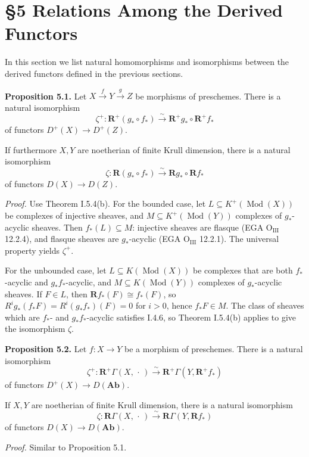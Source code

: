 \setcounter{page}{100}
\section{\S5 Relations Among the Derived Functors}

In this section we list natural homomorphisms and isomorphisms between the derived functors defined in the previous sections.

\textbf{Proposition 5.1.}
Let $X\xrightarrow{f} Y\xrightarrow{g} Z$ be morphisms of preschemes.
There is a natural isomorphism
\[
\zeta^+\colon \mathbf{R}^+(g_*\circ f_*) \xrightarrow{\sim} \mathbf{R}^+g_*\circ\mathbf{R}^+f_*
\]
of functors $D^+(X)\to D^+(Z)$.

If furthermore $X,Y$ are noetherian of finite Krull dimension, there is a natural isomorphism
\[
\zeta\colon \mathbf{R}(g_*\circ f_*) \xrightarrow{\sim} \mathbf{R}g_*\circ\mathbf{R}f_*
\]
of functors $D(X)\to D(Z)$.

\textit{Proof.}
Use Theorem I.5.4(b).
For the bounded case, let $L\subseteq K^+(\operatorname{Mod}(X))$ be complexes of injective sheaves,
and $M\subseteq K^+(\operatorname{Mod}(Y))$ complexes of $g_*$-acyclic sheaves.
Then $f_*(L)\subseteq M$: injective sheaves are flasque (EGA $\mathrm{O_{III}}$ 12.2.4),
and flasque sheaves are $g_*$-acyclic (EGA $\mathrm{O_{III}}$ 12.2.1).
The universal property yields $\zeta^+$.

\setcounter{page}{101}
For the unbounded case, let $L\subseteq K(\operatorname{Mod}(X))$ be complexes that are both $f_*$-acyclic and $g_*f_*$-acyclic,
and $M\subseteq K(\operatorname{Mod}(Y))$ complexes of $g_*$-acyclic sheaves.
If $F\in L$, then $\mathbf{R}f_*(F)\cong f_*(F)$,
so $R^ig_*(f_*F)=R^i(g_*f_*)(F)=0$ for $i>0$, hence $f_*F\in M$.
The class of sheaves which are $f_*$- and $g_*f_*$-acyclic satisfies I.4.6,
so Theorem I.5.4(b) applies to give the isomorphism $\zeta$.

\textbf{Proposition 5.2.}
Let $f\colon X\to Y$ be a morphism of preschemes.
There is a natural isomorphism
\[
\zeta^+\colon \mathbf{R}^+\Gamma(X,\,\cdot\,) \xrightarrow{\sim} \mathbf{R}^+\Gamma(Y,\mathbf{R}^+f_*)
\]
of functors $D^+(X)\to D(\mathbf{Ab})$.

If $X,Y$ are noetherian of finite Krull dimension, there is a natural isomorphism
\[
\zeta\colon \mathbf{R}\Gamma(X,\,\cdot\,) \xrightarrow{\sim} \mathbf{R}\Gamma(Y,\mathbf{R}f_*)
\]
of functors $D(X)\to D(\mathbf{Ab})$.

\setcounter{page}{102}
\textit{Proof.}
Similar to Proposition 5.1.


